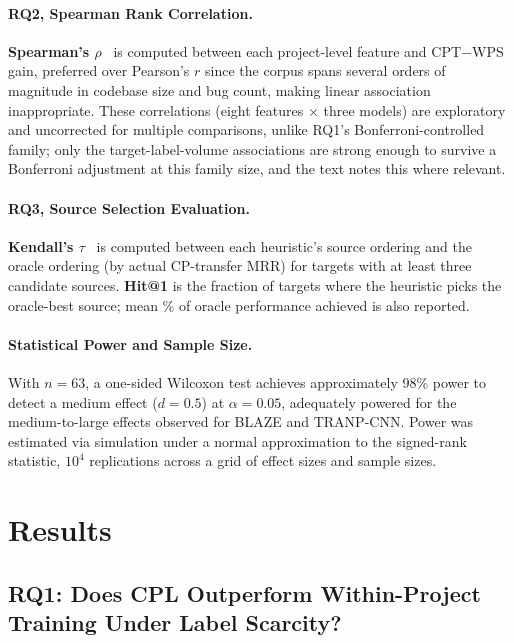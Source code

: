 \documentclass[a4paper,fleqn]{cas-dc}
\begin{document}
\paragraph{RQ2, Spearman Rank Correlation.}
\textbf{Spearman's $\rho$}~\citep{spearman1904} is computed between each
project-level feature and CPT$-$WPS gain, preferred over Pearson's $r$
since the corpus spans several orders of magnitude in codebase size and
bug count, making linear association inappropriate. These correlations
(eight features $\times$ three models) are exploratory and uncorrected for
multiple comparisons, unlike RQ1's Bonferroni-controlled family; only the
target-label-volume associations are strong enough to survive a Bonferroni
adjustment at this family size, and the text notes this where relevant.

\paragraph{RQ3, Source Selection Evaluation.}
 \textbf{Kendall's $\tau$}~\citep{kendall1938new} is computed
between each heuristic's source ordering and the oracle ordering (by actual
CP-transfer MRR) for targets with at least three candidate sources.
\textbf{Hit@1} is the fraction of targets where the heuristic picks the
oracle-best source; mean \% of oracle performance achieved is also
reported.

\paragraph{Statistical Power and Sample Size.}
With $n=63$, a one-sided Wilcoxon test achieves approximately 98\% power to
detect a medium effect ($d=0.5$) at $\alpha=0.05$, adequately powered for
the medium-to-large effects observed for BLAZE and TRANP-CNN. Power was
estimated via simulation under a normal approximation to the signed-rank
statistic, $10^4$ replications across a grid of effect sizes and sample
sizes.

\section{Results}
\label{sec:results}

\subsection{RQ1: Does CPL Outperform Within-Project Training Under Label Scarcity?}
\end{document}
